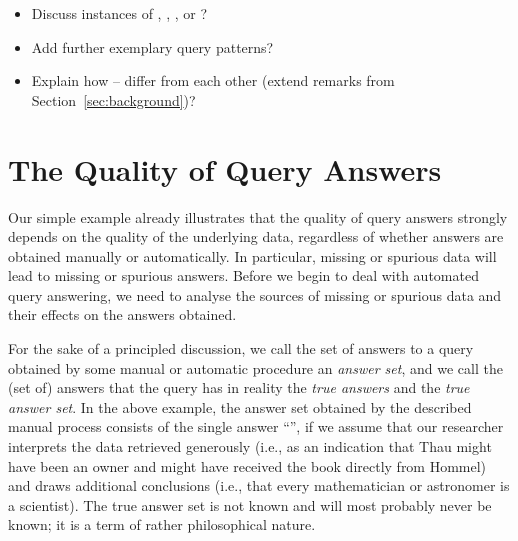 %
\begin{itemize}
  \item
    Discuss instances of , , , or ?
  \item
    Add further exemplary query patterns?
  \item
    Explain how -- differ from each other (extend remarks from Section~\ref{sec:background})?
\end{itemize}

\section{The Quality of Query Answers}
\label{sec:quality_of_answers}

Our simple example already illustrates that the quality of query answers
strongly depends on the quality of the underlying data,
regardless of whether answers are obtained manually or automatically. 
In particular, missing or spurious data will lead to missing or spurious answers.
Before we begin to deal with automated query answering,
we need to analyse the sources of missing or spurious data and their effects on the answers obtained.

For the sake of a principled discussion, we call the set of answers to a query obtained by some manual or automatic procedure
an \emph{answer set}, and we call the (set of) answers that the query has in reality the \emph{true answers} and the \emph{true answer set}.
In the above example, the answer set obtained by the described manual process consists of the single answer
\enquote{}, if we assume that our researcher interprets the data retrieved generously
(i.e., as an indication that Thau might have been an owner and might have received the book directly from Hommel)
and draws additional conclusions (i.e., that every mathematician or astronomer is a scientist).
The true answer set is not known and will most probably never be known; it is a term of rather philosophical nature.


